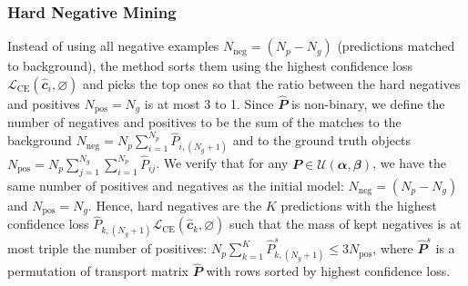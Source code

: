 \subsubsection{Hard Negative Mining} Instead of using all negative examples $N_{\text{neg}} = (N_p - N_g)$ (predictions matched to background), the method sorts them using the highest confidence loss $\mathcal{L}_{\mathrm{CE}}(\hat{\mathbfit{c}}_i,\varnothing)$ and picks the top ones so that the ratio between the hard negatives and positives $N_{\text{pos}} = N_g$ is at most 3 to 1.
Since $\hat{\mathbfit{P}}$ is non-binary, we define the number of negatives and positives to be the sum of the matches to the background $N_{\text{neg}} = N_p\sum_{i=1}^{N_p} \hat{P}_{i,(N_g+1)}$ and to the ground truth objects $N_{\text{pos}} = N_p\sum_{j=1}^{N_g}\sum_{i=1}^{N_p} \hat{P}_{ij}$. We verify that for any $\mathbfit{P} \in \mathcal{U}(\mathbfit{\alpha},\mathbfit{\beta})$, we have the same number of positives and negatives as the initial model: $N_{\text{neg}} = (N_p-N_g)$ and
$N_{\text{pos}} = N_g$. Hence, hard negatives are the $K$ predictions with the highest confidence loss $\hat{P}_{k,(N_g+1)} \mathcal{L}_{\mathrm{CE}}(\hat{\mathbfit{c}}_k, \varnothing)$ such that the mass of kept negatives is at most triple the number of positives: $N_p \sum_{k=1}^K \hat{P}_{k,(N_g+1)}^{s} \leq 3 N_{\text{pos}}$, where $\hat{\mathbfit{P}}^s$ is a permutation of transport matrix $\hat{\mathbfit{P}}$ with rows sorted by highest confidence loss.





